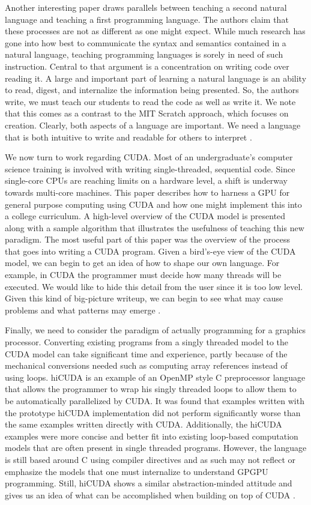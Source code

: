 \documentclass[twocolumn]{article}
\renewcommand{\|}{\origbar} %
\begin{document}
Another interesting paper draws parallels between teaching a second natural language and teaching a first programming language. The authors claim that these processes are not as different as one might expect. While much research has gone into how best to communicate the syntax and semantics contained in a natural language, teaching programming languages is sorely in need of such instruction. Central to that argument is a concentration on writing code over reading it. A large and important part of learning a natural language is an ability to read, digest, and internalize the information being presented. So, the authors write, we must teach our students to read the code as well as write it. We note that this comes as a contrast to the MIT Scratch approach, which focuses on creation. Clearly, both aspects of a language are important. We need a language that is both intuitive to write and readable for others to interpret \cite{robertson}.

We now turn to work regarding CUDA. Most of an undergraduate's computer science training is involved with writing single-threaded, sequential code. Since single-core CPUs are reaching limits on a hardware level, a shift is underway towards multi-core machines. This paper describes how to harness a GPU for general purpose computing using CUDA and how one might implement this into a college curriculum. A high-level overview of the CUDA model is presented along with a sample algorithm that illustrates the usefulness of teaching this new paradigm. The most useful part of this paper was the overview of the process that goes into writing a CUDA program. Given a bird's-eye view of the CUDA model, we can begin to get an idea of how to shape our own language. For example, in CUDA the programmer must decide how many threads will be executed. We would like to hide this detail from the user since it is too low level. Given this kind of big-picture writeup, we can begin to see what may cause problems and what patterns may emerge \cite{tran}.

Finally, we need to consider the paradigm of actually programming for a graphics processor. Converting existing programs from a singly threaded model to the CUDA model can take significant time and experience, partly because of the mechanical conversions needed such as computing array references instead of using loops. hiCUDA is an example of an OpenMP style C preprocessor language that allows the programmer to wrap his singly threaded loops to allow them to be automatically parallelized by CUDA. It was found that examples written with the prototype hiCUDA implementation did not perform significantly worse than the same examples written directly with CUDA. Additionally, the hiCUDA examples were more concise and better fit into existing loop-based computation models that are often present in single threaded programs. However, the language is still based around C using compiler directives and as such may not reflect or emphasize the models that one must internalize to understand GPGPU programming. Still, hiCUDA shows a similar abstraction-minded attitude and gives us an idea of what can be accomplished when building on top of CUDA \cite{han}.
\end{document}
